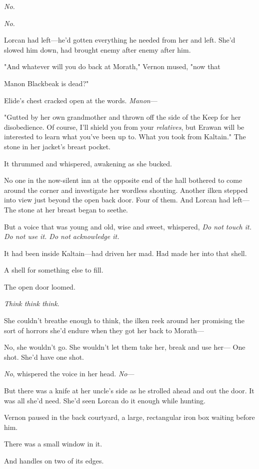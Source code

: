 \emph{No.}

\emph{No.}

Lorcan had left---he'd gotten everything he needed from her and left. She'd slowed him down, had brought enemy after enemy after him.

"And whatever will you do back at Morath," Vernon mused, "now that

Manon Blackbeak is dead?"

Elide's chest cracked open at the words. \emph{Manon}---

"Gutted by her own grandmother and thrown off the side of the Keep for her disobedience. Of course, I'll shield you from your \emph{relatives}, but  Erawan will be interested to learn what you've been up to. What you  took from Kaltain." The stone in her jacket's breast pocket.

It thrummed and whispered, awakening as she bucked.

No one in the now-silent inn at the opposite end of the hall bothered to come around the corner and investigate her wordless shouting. Another ilken stepped into view just beyond the open back door. Four of them. And Lorcan had left--- The stone at her breast began to seethe.

But a voice that was young and old, wise and sweet, whispered, \emph{Do not touch it. Do not use it. Do not acknowledge it.}

It had been inside Kaltain---had driven her mad. Had made her into that
 shell.

A shell for something else to fill.

The open door loomed.

\emph{Think think think}.

She couldn't breathe enough to think, the ilken reek around her promising the sort of horrors she'd endure when they got her back to Morath---

No, she wouldn't go. She wouldn't let them take her, break and use her--- One shot. She'd have one shot.

\emph{No}, whispered the voice in her head. \emph{No}---

But there was a knife at her uncle's side as he strolled ahead and out the door. It was all she'd need. She'd seen Lorcan do it enough while hunting.

Vernon paused in the back courtyard, a large, rectangular iron box waiting before him.

There was a small window in it.

And handles on two of its edges.

